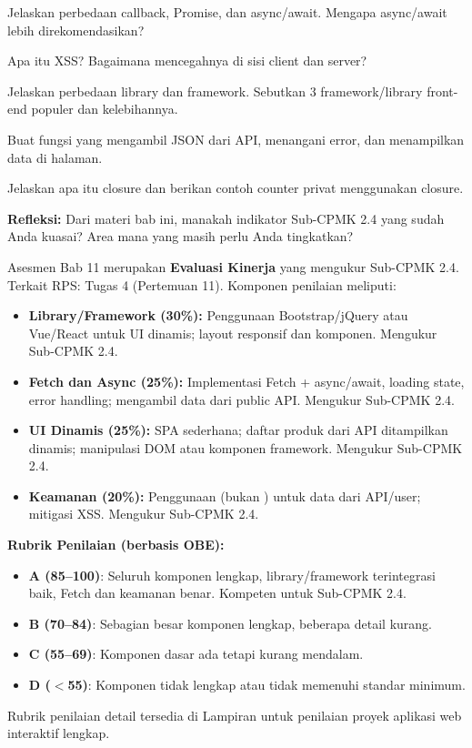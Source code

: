 \documentclass[../main.tex]{subfiles}
\begin{document}
\begin{latihan}
  \item Jelaskan perbedaan callback, Promise, dan async/await. Mengapa async/await lebih direkomendasikan?
  \item Apa itu XSS? Bagaimana mencegahnya di sisi client dan server?
  \item Jelaskan perbedaan library dan framework. Sebutkan 3 framework/library front-end populer dan kelebihannya.
  \item Buat fungsi  yang mengambil JSON dari API, menangani error, dan menampilkan data di halaman.
  \item Jelaskan apa itu closure dan berikan contoh counter privat menggunakan closure.
  \item \textbf{Refleksi:} Dari materi bab ini, manakah indikator Sub-CPMK 2.4 yang sudah Anda kuasai? Area mana yang masih perlu Anda tingkatkan?
\end{latihan}

\begin{asesmen}
Asesmen Bab 11 merupakan \textbf{Evaluasi Kinerja} yang mengukur Sub-CPMK 2.4. Terkait RPS: Tugas 4 (Pertemuan 11). Komponen penilaian meliputi:

\begin{itemize}[leftmargin=*]
  \item \textbf{Library/Framework (30\%):} Penggunaan Bootstrap/jQuery atau Vue/React untuk UI dinamis; layout responsif dan komponen. Mengukur Sub-CPMK 2.4.
  \item \textbf{Fetch dan Async (25\%):} Implementasi Fetch + async/await, loading state, error handling; mengambil data dari public API. Mengukur Sub-CPMK 2.4.
  \item \textbf{UI Dinamis (25\%):} SPA sederhana; daftar produk dari API ditampilkan dinamis; manipulasi DOM atau komponen framework. Mengukur Sub-CPMK 2.4.
  \item \textbf{Keamanan (20\%):} Penggunaan  (bukan ) untuk data dari API/user; mitigasi XSS. Mengukur Sub-CPMK 2.4.
\end{itemize}

\textbf{Rubrik Penilaian (berbasis OBE):}
\begin{itemize}
  \item \textbf{A (85--100)}: Seluruh komponen lengkap, library/framework terintegrasi baik, Fetch dan keamanan benar. Kompeten untuk Sub-CPMK 2.4.
  \item \textbf{B (70--84)}: Sebagian besar komponen lengkap, beberapa detail kurang.
  \item \textbf{C (55--69)}: Komponen dasar ada tetapi kurang mendalam.
  \item \textbf{D ($<$55)}: Komponen tidak lengkap atau tidak memenuhi standar minimum.
\end{itemize}

Rubrik penilaian detail tersedia di Lampiran untuk penilaian proyek aplikasi web interaktif lengkap.
\end{asesmen}
\end{document}
